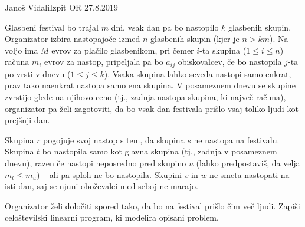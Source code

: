 \begin{naloga}{Janoš Vidali}{Izpit OR 27.8.2019}
\begin{vprasanje}
Glasbeni festival bo trajal $m$ dni,
vsak dan pa bo nastopilo $k$ glasbenih skupin.
Organizator izbira nastopajoče izmed $n$ glasbenih skupin
(kjer je $n > km$).
Na voljo ima $M$ evrov za plačilo glasbenikom,
pri čemer $i$-ta skupina ($1 \le i \le n$)
računa $m_i$ evrov za nastop,
pripeljala pa bo $a_{ij}$ obiskovalcev,
če bo nastopila $j$-ta po vrsti v dnevu ($1 \le j \le k$).
Vsaka skupina lahko seveda nastopi samo enkrat,
prav tako naenkrat nastopa samo ena skupina.
V posameznem dnevu se skupine zvrstijo glede na njihovo ceno
(tj., zadnja nastopa skupina, ki največ računa),
organizator pa želi zagotoviti,
da bo vsak dan festivala prišlo vsaj toliko ljudi kot prejšnji dan.

Skupina $r$ pogojuje svoj nastop s tem,
da skupina $s$ ne nastopa na festivalu.
Skupina $t$ bo nastopila samo kot glavna skupina
(tj., zadnja v posameznem dnevu),
razen če nastopi neposredno pred skupino $u$
(lahko predpostaviš, da velja $m_t \le m_u$)
-- ali pa sploh ne bo nastopila.
Skupini $v$ in $w$ ne smeta nastopati na isti dan,
saj se njuni oboževalci med seboj ne marajo.

Organizator želi določiti spored tako,
da bo na festival prišlo čim več ljudi.
Zapiši celoštevilski linearni program, ki modelira opisani problem.
\end{vprasanje}


\end{naloga}
